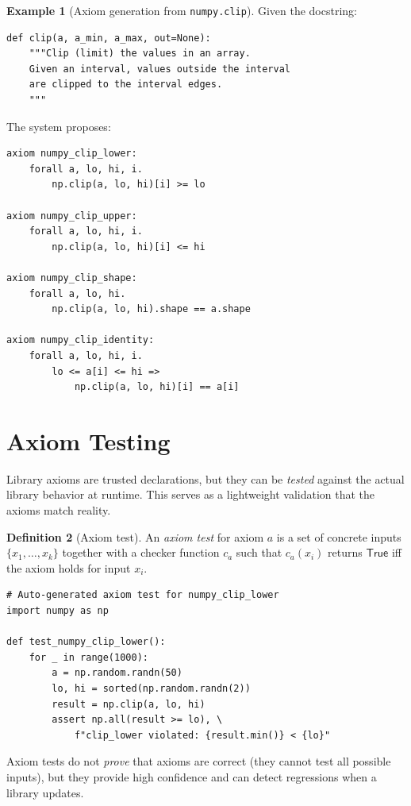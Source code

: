 \documentclass[11pt,a4paper]{report}
\theoremstyle{definition}
\newtheorem{definition}{Definition}[chapter]
\newtheorem{example}[definition]{Example}
\theoremstyle{plain}
\begin{document}
\begin{example}[Axiom generation from \texttt{numpy.clip}]
Given the docstring:
\begin{lstlisting}[style=python]
def clip(a, a_min, a_max, out=None):
    """Clip (limit) the values in an array.
    Given an interval, values outside the interval
    are clipped to the interval edges.
    """
\end{lstlisting}
The system proposes:
\begin{lstlisting}[style=proof]
axiom numpy_clip_lower:
    forall a, lo, hi, i.
        np.clip(a, lo, hi)[i] >= lo

axiom numpy_clip_upper:
    forall a, lo, hi, i.
        np.clip(a, lo, hi)[i] <= hi

axiom numpy_clip_shape:
    forall a, lo, hi.
        np.clip(a, lo, hi).shape == a.shape

axiom numpy_clip_identity:
    forall a, lo, hi, i.
        lo <= a[i] <= hi =>
            np.clip(a, lo, hi)[i] == a[i]
\end{lstlisting}
\end{example}

\section{Axiom Testing}

Library axioms are trusted declarations, but they can be \emph{tested}
against the actual library behavior at runtime.  This serves as a
lightweight validation that the axioms match reality.

\begin{definition}[Axiom test]
An \emph{axiom test} for axiom $a$ is a set of concrete inputs
$\{x_1, \ldots, x_k\}$ together with a checker function $c_a$ such that
$c_a(x_i)$ returns $\mathsf{True}$ iff the axiom holds for input $x_i$.
\end{definition}

\begin{lstlisting}[style=python]
# Auto-generated axiom test for numpy_clip_lower
import numpy as np

def test_numpy_clip_lower():
    for _ in range(1000):
        a = np.random.randn(50)
        lo, hi = sorted(np.random.randn(2))
        result = np.clip(a, lo, hi)
        assert np.all(result >= lo), \
            f"clip_lower violated: {result.min()} < {lo}"
\end{lstlisting}

Axiom tests do not \emph{prove} that axioms are correct (they cannot test
all possible inputs), but they provide high confidence and can detect
regressions when a library updates.
\end{document}
